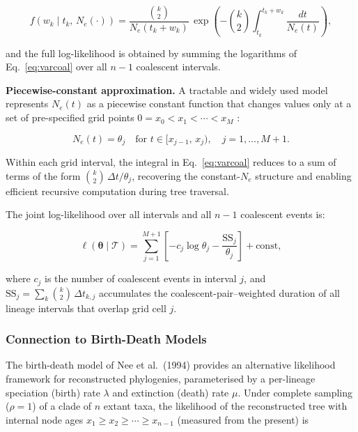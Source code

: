 \documentclass[11pt, a4paper]{article}
\begin{document}
\begin{equation}
    f\!\left(w_k \mid t_k,\, N_e(\cdot)\right)
    = \frac{\binom{k}{2}}{N_e(t_k + w_k)}\,
      \exp\!\left(-\binom{k}{2}\int_{t_k}^{t_k + w_k}
      \frac{dt}{N_e(t)}\right),
    \label{eq:varcoal}
\end{equation}

and the full log-likelihood is obtained by summing the logarithms of
Eq.~\eqref{eq:varcoal} over all $n-1$ coalescent intervals.

\medskip
\noindent\textbf{Piecewise-constant approximation.}
A tractable and widely used model represents $N_e(t)$ as a piecewise constant function
that changes values only at a set of pre-specified grid points
$0 = x_0 < x_1 < \cdots < x_M$ \cite{gill2013}:

\begin{equation}
    N_e(t) = \theta_j \quad \text{for } t \in [x_{j-1},\, x_j),
    \quad j = 1, \ldots, M+1.
    \label{eq:piecewise}
\end{equation}

Within each grid interval, the integral in Eq.~\eqref{eq:varcoal} reduces to a sum of
terms of the form $\binom{k}{2}\,\Delta t / \theta_j$, recovering the constant-$N_e$
structure and enabling efficient recursive computation during tree traversal.

The joint log-likelihood over all intervals and all $n-1$ coalescent events is:

\begin{equation}
    \ell\!\left(\boldsymbol{\theta} \mid \mathcal{T}\right)
    = \sum_{j=1}^{M+1}\left[-c_j\log\theta_j - \frac{\mathrm{SS}_j}{\theta_j}\right]
    + \text{const},
    \label{eq:pccoal}
\end{equation}

where $c_j$ is the number of coalescent events in interval $j$, and
$\mathrm{SS}_j = \sum_k \binom{k}{2}\,\Delta t_{k,j}$ accumulates the
coalescent-pair--weighted duration of all lineage intervals that overlap grid cell $j$.

\subsubsection{Connection to Birth-Death Models}

The birth-death model of Nee et al.\ (1994) \cite{nee1994} provides an alternative
likelihood framework for reconstructed phylogenies, parameterised by a per-lineage
speciation (birth) rate $\lambda$ and extinction (death) rate $\mu$.
Under complete sampling ($\rho = 1$) of a clade of $n$ extant taxa, the likelihood
of the reconstructed tree with internal node ages
$x_1 \geq x_2 \geq \cdots \geq x_{n-1}$ (measured from the present) is
\end{document}
